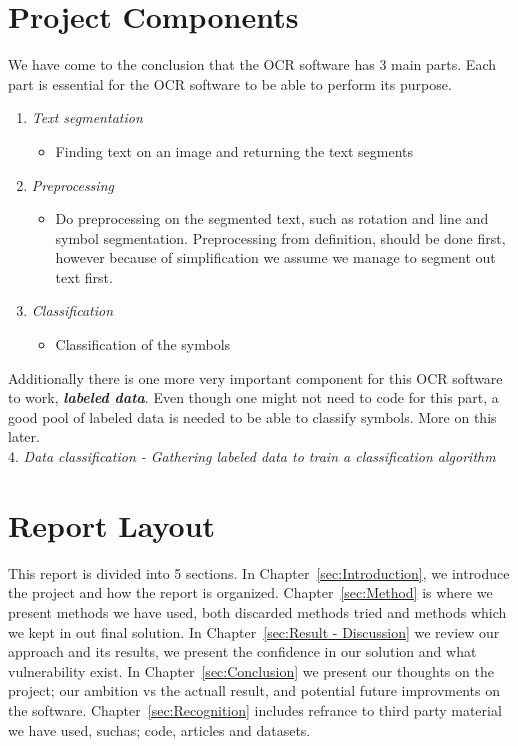 \documentclass[11pt,a4paper,UKenglish]{report}
\begin{document}
\section{Project Components}
We have come to the conclusion that the OCR software has 3 main parts. Each
part is essential for the OCR software to be able to perform its purpose.
\begin{enumerate}
 \item{\textit{Text segmentation}}
 \begin{itemize}
  \item{Finding text on an image and returning the text segments}
 \end{itemize}
 \item{\textit{Preprocessing}}
 \begin{itemize}
  \item{Do preprocessing on the segmented text, such as rotation and line and
  symbol segmentation. Preprocessing from definition, should be done first,
  however because of simplification we assume we manage to segment out text
  first.}
 \end{itemize}
 \item{\textit{Classification}}
 \begin{itemize}
  \item{Classification of the symbols}
 \end{itemize}
\end{enumerate}

\begin{flushleft}
  Additionally there is one more very important component for this
  OCR software to work, \textit{\textbf{labeled data}}. Even though one might not
  need to code for this part, a good pool of labeled data is needed to be able to
  classify symbols. More on this later. \\
  4. \textit{Data classification - Gathering labeled data to train a classification algorithm}
\end{flushleft}


\section{Report Layout}
\label{subsec:Report Layout}
This report is divided into 5 sections. In
Chapter~\ref{sec:Introduction}, we introduce the project and how the report
is organized. Chapter~\ref{sec:Method} is where we present methods we have
used, both discarded methods tried and methods which we kept in out final
solution. In Chapter~\ref{sec:Result - Discussion} we review our approach and
its results, we present the confidence in our solution and what vulnerability
exist. In Chapter~\ref{sec:Conclusion} we present our thoughts on the project;
our ambition vs the actuall result, and potential future improvments on the
software. Chapter~\ref{sec:Recognition} includes refrance to third party
material we have used, suchas; code, articles and datasets.
\end{document}
